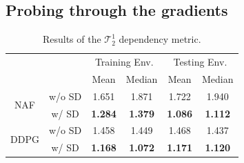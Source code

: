 \documentclass[../thesis.tex]{subfiles}
\begin{document}
\subsection{Probing through the gradients}

\begin{table}[t]
\begin{center}
\caption{Results of the $\mathcal{T}_2^1$ dependency metric.}
\label{table:policy-ratio}
\begin{small}
\begin{tabular}{cccccc}
\toprule 
\centering
 & & \multicolumn{2}{c}{Training Env.} & \multicolumn{2}{c}{Testing Env.}  \\
 & & Mean & Median & Mean & Median \\ \midrule \midrule
\multirow{2}{*}{NAF}  & w/o SD & 1.651 & 1.871 & 1.722 & 1.940 \\
                      & w/ SD  & \textbf{1.284} & \textbf{1.379} & \textbf{1.086} & \textbf{1.112} \\ \midrule
\multirow{2}{*}{DDPG} & w/o SD & 1.458 & 1.449 & 1.468 & 1.437 \\
                      & w/ SD  & \textbf{1.168} & \textbf{1.072} & \textbf{1.171} & \textbf{1.120} \\ \toprule
\end{tabular}
\end{small}
\end{center}
\end{table}
\end{document}
